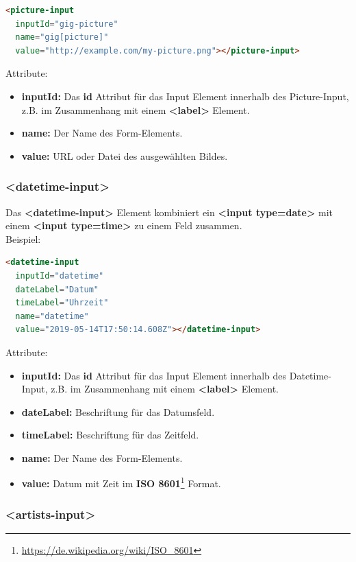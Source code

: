 \begin{lstlisting}[language=html,frame=single]
<picture-input
  inputId="gig-picture"
  name="gig[picture]"
  value="http://example.com/my-picture.png"></picture-input>
\end{lstlisting}

\noindent{}Attribute:
\begin{itemize}
  \tightlist{}
  \item{} \textbf{inputId:} Das \textbf{id} Attribut für das Input Element innerhalb des Picture-Input, z.B. im Zusammenhang mit einem \textbf{<label>} Element.
  \item{} \textbf{name:} Der Name des Form-Elements.
  \item{} \textbf{value:} URL oder Datei des ausgewählten Bildes.
\end{itemize}

\clearpage
\subsubsection{<datetime-input>}

Das \textbf{<datetime-input>} Element kombiniert ein \textbf{<input type=date>}
mit einem \textbf{<input type=time>} zu einem Feld zusammen.
\\
\noindent{}Beispiel:

\begin{lstlisting}[language=html,frame=single]
<datetime-input
  inputId="datetime"
  dateLabel="Datum"
  timeLabel="Uhrzeit"
  name="datetime"
  value="2019-05-14T17:50:14.608Z"></datetime-input>
\end{lstlisting}

\noindent{}Attribute:
\begin{itemize}
  \tightlist{}
  \item{} \textbf{inputId:} Das \textbf{id} Attribut für das Input Element innerhalb des Datetime-Input, z.B. im Zusammenhang mit einem \textbf{<label>} Element.
  \item{} \textbf{dateLabel:} Beschriftung für das Datumsfeld.
  \item{} \textbf{timeLabel:} Beschriftung für das Zeitfeld.
  \item{} \textbf{name:} Der Name des Form-Elements.
  \item{} \textbf{value:} Datum mit Zeit im \textbf{ISO 8601}\footnote{\url{https://de.wikipedia.org/wiki/ISO_8601}} Format.
\end{itemize}

\subsubsection{<artists-input>}


